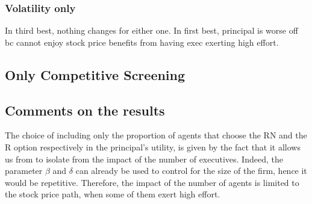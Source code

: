 \subsubsection*{Volatility only}
In third best, nothing changes for either one. In first best, principal is worse off bc cannot enjoy stock price benefits from having exec exerting high effort.

\subsection*{Only Competitive Screening}


\subsection*{Comments on the results}
The choice of including only the proportion of agents that choose the RN and the R option respectively in the principal's utility, is given by the fact that it allows us from to isolate from the impact of the number of executives. Indeed, the parameter $\beta$ and $\delta$ can already be used to control for the size of the firm, hence it would be repetitive. Therefore, the impact of the number of agents is limited to the stock price path, when some of them exert high effort.